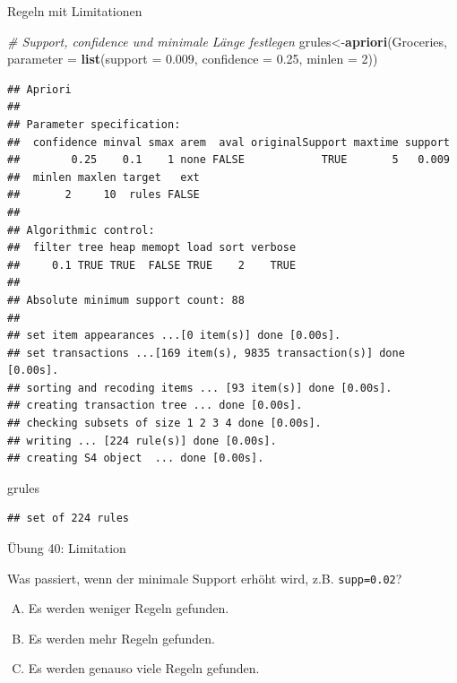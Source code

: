 \documentclass[12pt,ngerman,a4paper,ignorenonframetext,]{beamer}
\newenvironment{Shaded}{\begin{snugshade}}{\end{snugshade}}
\newcommand{\CommentTok}[1]{\textcolor[rgb]{0.56,0.35,0.01}{\textit{#1}}}
\newcommand{\DataTypeTok}[1]{\textcolor[rgb]{0.13,0.29,0.53}{#1}}
\newcommand{\DecValTok}[1]{\textcolor[rgb]{0.00,0.00,0.81}{#1}}
\newcommand{\FloatTok}[1]{\textcolor[rgb]{0.00,0.00,0.81}{#1}}
\newcommand{\KeywordTok}[1]{\textcolor[rgb]{0.13,0.29,0.53}{\textbf{#1}}}
\newcommand{\NormalTok}[1]{#1}
\providecommand{\tightlist}{%
  \setlength{\itemsep}{0pt}\setlength{\parskip}{0pt}}
\begin{document}
\begin{frame}{Regeln mit Limitationen}
\protect\hypertarget{regeln-mit-limitationen}{}

\begin{Shaded}
\begin{Highlighting}[]
\CommentTok{# Support, confidence und minimale Länge festlegen}
\NormalTok{grules<-}\KeywordTok{apriori}\NormalTok{(Groceries, }\DataTypeTok{parameter =} \KeywordTok{list}\NormalTok{(}\DataTypeTok{support =} \FloatTok{0.009}\NormalTok{, }\DataTypeTok{confidence =} \FloatTok{0.25}\NormalTok{, }\DataTypeTok{minlen =} \DecValTok{2}\NormalTok{))}
\end{Highlighting}
\end{Shaded}

\begin{verbatim}
## Apriori
## 
## Parameter specification:
##  confidence minval smax arem  aval originalSupport maxtime support
##        0.25    0.1    1 none FALSE            TRUE       5   0.009
##  minlen maxlen target   ext
##       2     10  rules FALSE
## 
## Algorithmic control:
##  filter tree heap memopt load sort verbose
##     0.1 TRUE TRUE  FALSE TRUE    2    TRUE
## 
## Absolute minimum support count: 88 
## 
## set item appearances ...[0 item(s)] done [0.00s].
## set transactions ...[169 item(s), 9835 transaction(s)] done [0.00s].
## sorting and recoding items ... [93 item(s)] done [0.00s].
## creating transaction tree ... done [0.00s].
## checking subsets of size 1 2 3 4 done [0.00s].
## writing ... [224 rule(s)] done [0.00s].
## creating S4 object  ... done [0.00s].
\end{verbatim}

\begin{Shaded}
\begin{Highlighting}[]
\NormalTok{grules}
\end{Highlighting}
\end{Shaded}

\begin{verbatim}
## set of 224 rules
\end{verbatim}

\end{frame}

\begin{frame}[fragile]{Übung 40: Limitation}
\protect\hypertarget{ubung-40-limitation}{}

Was passiert, wenn der minimale Support erhöht wird, z.\thinspace{}B.
\texttt{supp=0.02}?

\begin{enumerate}
[A.]
\tightlist
\item
  Es werden weniger Regeln gefunden.
\item
  Es werden mehr Regeln gefunden.
\item
  Es werden genauso viele Regeln gefunden.
\end{enumerate}


\end{frame}
\end{document}
